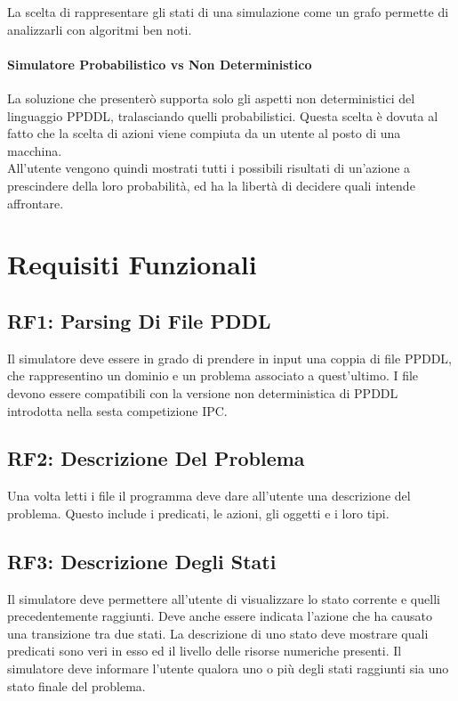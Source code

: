 \documentclass[a4paper, 11pt, titlepage, twoside, openany]{book}
\begin{document}
La scelta di rappresentare gli stati di una simulazione come un grafo permette di analizzarli con algoritmi ben noti.

\paragraph{Simulatore Probabilistico vs Non Deterministico}
La soluzione che presenterò supporta solo gli aspetti non deterministici del linguaggio PPDDL, tralasciando quelli probabilistici. Questa scelta è dovuta al fatto che la scelta di azioni viene compiuta da un utente al posto di una macchina.\\
All'utente vengono quindi mostrati tutti i possibili risultati di un'azione a prescindere della loro probabilità, ed ha la libertà di decidere quali intende affrontare. 

\section{Requisiti Funzionali}
\subsection{RF1: Parsing Di File PDDL}
Il simulatore deve essere in grado di prendere in input una coppia di file PPDDL, che rappresentino un dominio e un problema associato a quest'ultimo.
I file devono essere compatibili con la versione non deterministica di PPDDL introdotta nella sesta competizione IPC.

\subsection{RF2: Descrizione Del Problema}
Una volta letti i file il programma deve dare all'utente una descrizione del problema. Questo include i predicati, le azioni, gli oggetti e i loro tipi.

\subsection{RF3: Descrizione Degli Stati}
Il simulatore deve permettere all'utente di visualizzare lo stato corrente e quelli precedentemente raggiunti. Deve anche essere indicata l'azione che ha causato una transizione tra due stati.
La descrizione di uno stato deve mostrare quali predicati sono veri in esso ed il livello delle risorse numeriche presenti.
Il simulatore deve informare l'utente qualora uno o più degli stati raggiunti sia uno stato finale del problema.
\end{document}
